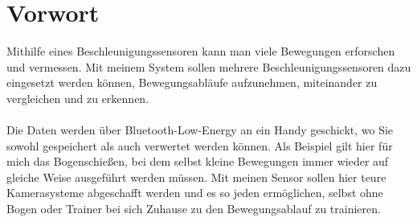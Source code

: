 \chapter[Vorwort]{Vorwort}

Mithilfe eines Beschleunigungssensoren kann man viele 
Bewegungen erforschen und vermessen.
Mit meinem System sollen mehrere Beschleunigungssensoren 
dazu eingesetzt werden können, Bewegungsabläufe aufzunehmen, 
miteinander zu vergleichen und zu erkennen.\\
\\
Die Daten werden über Bluetooth-Low-Energy an ein Handy 
geschickt, wo Sie sowohl gespeichert als auch verwertet 
werden können. Als Beispiel gilt hier für mich das Bogenschießen, 
bei dem selbst kleine Bewegungen immer wieder auf gleiche Weise 
ausgeführt werden müssen. Mit meinen Sensor sollen hier teure 
Kamerasysteme abgeschafft werden und es so jeden ermöglichen, 
selbst ohne Bogen oder Trainer bei sich Zuhause zu den 
Bewegungsablauf zu trainieren.  